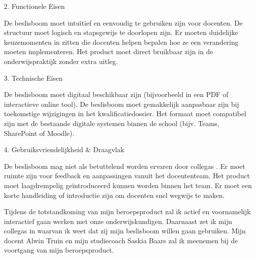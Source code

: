 2. Functionele Eisen

    De beslisboom moet intuïtief en eenvoudig te gebruiken zijn voor docenten.
    De structuur moet logisch en stapsgewijs te doorlopen zijn.
    Er moeten duidelijke keuzemomenten in zitten die docenten helpen bepalen hoe ze een verandering moeten implementeren.
    Het product moet direct bruikbaar zijn in de onderwijspraktijk zonder extra uitleg.

3. Technische Eisen

    De beslisboom moet digitaal beschikbaar zijn (bijvoorbeeld in een PDF of interactieve online tool).
    De beslisboom moet gemakkelijk aanpasbaar zijn bij toekomstige wijzigingen in het kwalificatiedossier.
    Het formaat moet compatibel zijn met de bestaande digitale systemen binnen de school (bijv. Teams, SharePoint of Moodle).

4. Gebruiksvriendelijkheid \& Draagvlak

    De beslisboom mag niet als betuttelend worden ervaren door collega\textquotesingle s
    .
    Er moet ruimte zijn voor feedback en aanpassingen vanuit het docententeam.
    Het product moet laagdrempelig geïntroduceerd kunnen worden binnen het team.
    Er moet een korte handleiding of introductie zijn om docenten snel wegwijs te maken.

Tijdens de totstandkoming van mijn beroepsproduct zal ik actief en voornamelijk interactief gaan werken met onze onderwijskundigen. Daarnaast zet ik mijn collega\textquotesingle s
 in waarvan ik weet dat zij mijn beslisboom willen gaan gebruiken. Mijn docent Alwin Truin en mijn studiecoach Saskia Baars zal ik meenemen bij de voortgang van mijn beroepsproduct. 